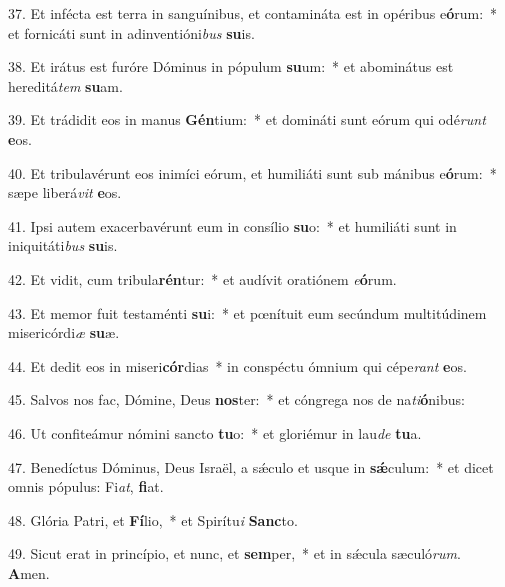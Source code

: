 37. Et infécta est terra in sanguínibus, et contamináta est in opéribus e\textbf{ó}rum:~*  et fornicáti sunt in adinventióni\textit{bus} \textbf{su}is.\

38. Et irátus est furóre Dóminus in pópulum \textbf{su}um:~*  et abominátus est hereditá\textit{tem} \textbf{su}am.\

39. Et trádidit eos in manus \textbf{Gén}tium:~*  et domináti sunt eórum qui odé\textit{runt} \textbf{e}os.\

40. Et tribulavérunt eos inimíci eórum, et humiliáti sunt sub mánibus e\textbf{ó}rum:~*  sæpe liberá\textit{vit} \textbf{e}os.\

41. Ipsi autem exacerbavérunt eum in consílio \textbf{su}o:~*  et humiliáti sunt in iniquitáti\textit{bus} \textbf{su}is.\

42. Et vidit, cum tribula\textbf{rén}tur:~*  et audívit oratiónem \textit{e}\textbf{ó}rum.\

43. Et memor fuit testaménti \textbf{su}i:~*  et pœnítuit eum secúndum multitúdinem misericórdi\textit{æ} \textbf{su}æ.\

44. Et dedit eos in miseri\textbf{cór}dias~*  in conspéctu ómnium qui cépe\textit{rant} \textbf{e}os.\

45. Salvos nos fac, Dómine, Deus \textbf{nos}ter:~*  et cóngrega nos de na\textit{ti}\textbf{ó}nibus:\

46. Ut confiteámur nómini sancto \textbf{tu}o:~*  et gloriémur in lau\textit{de} \textbf{tu}a.\

47. Benedíctus Dóminus, Deus Israël, a sǽculo et usque in \textbf{sǽ}culum:~*  et dicet omnis pópulus: Fi\textit{at}, \textbf{fi}at.\

48. Glória Patri, et \textbf{Fí}lio,~*  et Spirítu\textit{i} \textbf{Sanc}to.\

49. Sicut erat in princípio, et nunc, et \textbf{sem}per,~*  et in sǽcula sæculó\textit{rum}. \textbf{A}men.\

